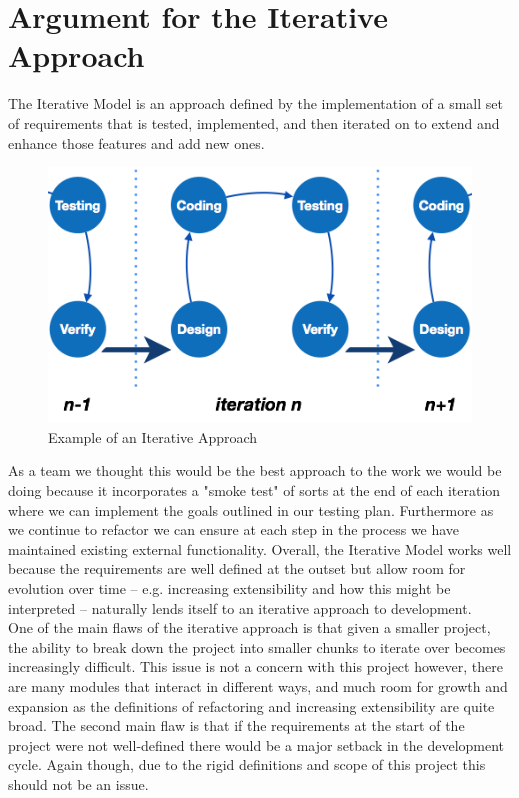 \documentclass{article}
\begin{document}
\section{Argument for the Iterative Approach}
The Iterative Model is an approach defined by the implementation of a small set of requirements that is tested, implemented, and then iterated on to extend and enhance those features and add new ones.

\begin{figure}[h]
\caption{Example of an Iterative Approach}
\centering
\includegraphics[scale=0.5]{sdlc_iterative}
\end{figure}


As a team we thought this would be the best approach to the work we would be doing because it incorporates a "smoke test" of sorts at the end of each iteration where we can implement the goals outlined in our testing plan. Furthermore as we continue to refactor we can ensure at each step in the process we have maintained existing external functionality. Overall, the Iterative Model works well because the requirements are well defined at the outset but allow room for evolution over time -- e.g. increasing extensibility and how this might be interpreted -- naturally lends itself to an iterative approach to development.\hfill \\

One of the main flaws of the iterative approach is that given a smaller project, the ability to break down the project into smaller chunks to iterate over becomes increasingly difficult. This issue is not a concern with this project however, there are many modules that interact in different ways, and much room for growth and expansion as the definitions of refactoring and increasing extensibility are quite broad. The second main flaw is that if the requirements at the start of the project were not well-defined there would be a major setback in the development cycle. Again though, due to the rigid definitions and scope of this project this should not be an issue.
\end{document}
